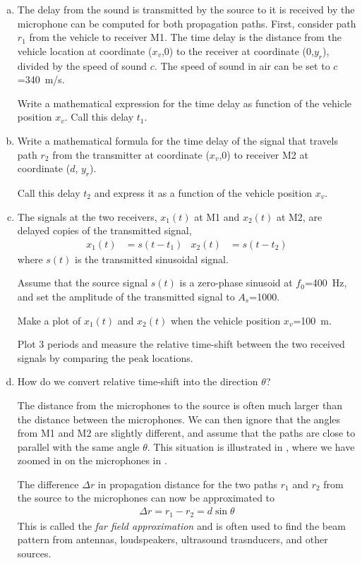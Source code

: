 \begin{enumerate}[a)]
	\item The delay from the sound is transmitted by the source to it is received by the microphone can be computed for both propagation paths. First, consider path $r_1$ from the vehicle to receiver M1. The time delay is the distance from the vehicle location at coordinate ($x_v$,0) to the
	receiver at coordinate (0,$y_r$), divided by the speed of sound $c$.
	The speed of sound in air can be set to $c$=\qty{340}{m/s}. 
	
	Write a mathematical expression for the time delay as function of the vehicle position $x_v$. 
	Call this delay $t_1$.
		
	\item Write a mathematical formula for the time delay of the signal that travels path $r_2$ from the transmitter at coordinate ($x_v$,0) to receiver M2 at coordinate ($d$, $y_r$).
	
	Call this delay $t_2$ and express it as a function of the vehicle position $x_v$.
	
	\item The signals at the two receivers, $x_1(t)$ at M1 and $x_2(t)$ at M2, are delayed copies of the transmitted signal,
	\begin{align*}
		x_1(t)&= s(t-t_1)  &	x_2(t)&= s(t-t_2)  
	\end{align*}
	where $s(t)$ is the transmitted sinusoidal signal.
	
	Assume that the source signal $s(t)$ is a zero-phase sinusoid at $f_0$=\qty{400}{Hz}, and set the amplitude of the transmitted signal to $A_s$=\num{1000}. 
	
	Make a plot of $x_1(t)$ and $x_2(t)$ when the vehicle position $x_v$=\qty{100}{m}.
	
	Plot 3 periods and measure the relative time-shift between the two received
	signals by comparing the peak locations.
	
	\item How do we convert relative time-shift into the direction $\theta$?
	
	The distance from the microphones to the source is often much larger than the distance between the microphones. We can then ignore that the angles from M1 and M2 are slightly different, and assume that the paths are close to parallel with the same angle $\theta$. This situation is illustrated in , where we have zoomed in on the microphones in . 
	
	The difference $\Delta r$ in propagation distance for the two paths $r_1$ and $r_2$ from the source to the microphones can now be approximated to
	\begin{align}
		\Delta r = r_1-r_2 = d \sin\theta 
	\end{align}
	This is called the \emph{far field approximation} and is often used to find the beam pattern from antennas, loudspeakers, ultrasound trasnducers, and other sources.
	

\end{enumerate}
